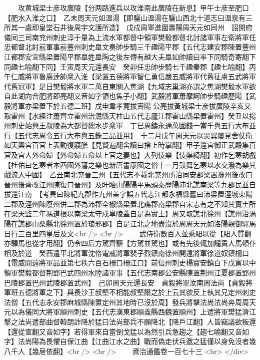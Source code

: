 　　攻黄城梁士彦攻廣陵【分两路進兵以攻淮南此廣陵在新息】甲午士彦至肥口【肥水入淮之口】　乙未周天元如温湯【即驪山温湯在驪山西北十道志曰温泉有三所其一處即皇堂石井後周宇文護所造】　戊戍周軍進圍壽陽周天元如同州　詔開府儀同三司南兖州刺史淳于量為上流水軍都督中領軍樊毅都督北討諸軍事左衛將軍任忠都督北討前軍事前豐州刺史臯文奏帥步騎三千趣陽平郡【五代志建安郡陳置豐州江都郡安宜縣梁置陽平郡臯姓臯陶之後左傳有越大夫臯如帥讀曰率下同騎奇寄翻下同趣七喻翻下同】壬寅周天元還長安　癸卯任忠帥步騎七千趣秦郡【趣七喻翻】丙午仁威將軍魯廣逹帥衆入淮【梁置五德將軍智仁勇信嚴五威將軍代舊征虜五武將軍代舊冠軍】是日樊毅將水軍二萬自東關入焦湖【九域志巢湖亦謂之焦湖樊毅水軍欲自此湖向合肥將即亮翻又音如字領也焦子小翻】武毅將軍蕭摩訶帥步騎趣歷陽【武毅將軍亦梁置下於五德二班】戊申韋孝寛拔壽陽公亮拔黃城梁士彦拔廣陵辛亥又取霍州【水經注蕭齊立霍州治灊縣天柱山五代志廬江郡霍山縣梁置霍州】癸丑以揚州刺史始興王叔陵為大都督總水步衆軍　丁巳周鑄永通萬國錢一當千與五行大布並行【五代志周令五行大布與五銖三品並用】　十二月戊午周天元以災異屢見舍仗衛如天興宫百官上表勸復寢膳【見賢遍翻舍讀曰捨上時掌翻】甲子還宫御正武殿集百官及宫人外命婦【外命婦五命以上官之妻也】大列伎樂【伎渠綺翻】初作乞寒胡戲【杜佑曰乞寒者本西國外藩之樂也新唐書康國之俗十一月鼓舞乞寒以水交潑為樂其戲流入中國】　乙丑南北兖晉三州【五代志不載北兖州所治同安郡梁置豫州後改曰晉州後齊改江州陳復曰晉州】及盱眙山陽陽平馬頭秦歷陽沛北譙南梁等九郡民並自拔還江南　【考異曰陳紀九郡作九州盖字誤五代志江都永福縣舊曰沛梁置涇城東陽二郡及涇州陳廢州併二郡為沛郡全椒縣梁置北譙郡南梁郡自宋志有之不知其實土所在梁天監二年馮道根以南梁太守戍阜陵蓋自是為實土】周又取譙北徐州【譙州治渦陽在譙郡山桑縣北徐州置於琅邪郡】自是江北之地盡沒於周周天元如洛陽親御驛馬日行三百里四皇后及文<br />
<br />
　　武侍衛數百人並乘馹以從【馹人質翻亦驛馬也從才用翻】仍令四后方駕齊驅【方駕並駕也】或有先後輒加譴責人馬頓仆相及於道　癸酉遣平北將軍沈恪電威將軍裴子烈鎮南徐州開遠將軍徐道奴鎮柵口【電威開遠將軍品並第七秩六百石柵口柵江口】前信州刺史楊寶安鎮白下戊寅以中領軍樊毅都督荆郢巴武四州水陸諸軍事【五代志南郡公安縣陳置荆州江夏郡置郢州巴陵郡置巴州武陵郡置武州】　己卯周天元還長安　貞毅將軍汝南周法尚【貞毅將軍班五德將軍之下】與長沙王叔堅不相能叔堅譖之於上云其欲反上執其兄定州刺史法僧【五代志永安郡麻城縣陳置定州其地時已沒於周】發兵將擊法尚法尚奔周周天元以為儀同大將軍順州刺史【五代志漢東郡順義縣西魏置順州】上遣將軍樊猛濟江撃之法尚遣部曲督韓朗詐降於猛曰法尚部兵不願降北【降戶江翻】人皆竊議欲叛還【還從宣翻又音如字】若得軍來自當倒戈猛以為然引兵急趨之【趨七喻翻又音如字】法尚陽為畏懼自保江曲【江曲江水之曲】戰而偽走伏兵邀之猛僅以身免沒者幾八千人【幾居依翻】<br />
<br />
　　資治通鑑卷一百七十三  <br>
   </div> 

